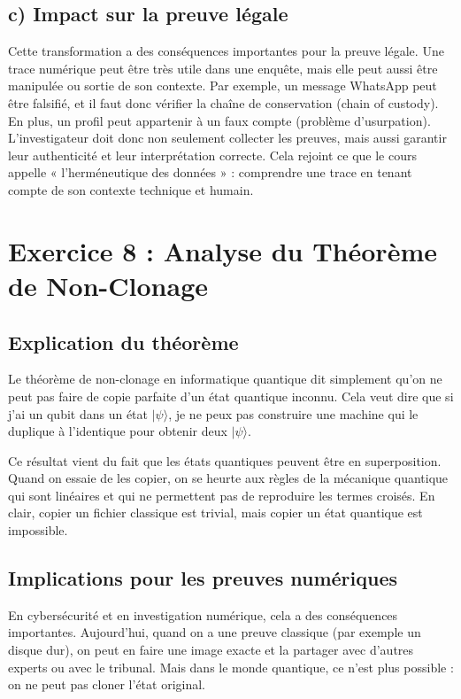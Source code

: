 \documentclass[12pt,a4paper]{report}
\begin{document}
	\subsection*{c) Impact sur la preuve légale}
	
	Cette transformation a des conséquences importantes pour la preuve légale.  
	Une trace numérique peut être très utile dans une enquête, 
	mais elle peut aussi être manipulée ou sortie de son contexte.  
	Par exemple, un message WhatsApp peut être falsifié, 
	et il faut donc vérifier la chaîne de conservation (chain of custody).  
	En plus, un profil peut appartenir à un faux compte (problème d’usurpation).  
	L’investigateur doit donc non seulement collecter les preuves, 
	mais aussi garantir leur authenticité et leur interprétation correcte.  
	Cela rejoint ce que le cours appelle « l’herméneutique des données » : 
	comprendre une trace en tenant compte de son contexte technique et humain.
	
	\section*{Exercice 8 : Analyse du Théorème de Non-Clonage}
	
	\subsection*{Explication du théorème}
	
	Le théorème de non-clonage en informatique quantique dit simplement qu’on ne peut pas 
	faire de copie parfaite d’un état quantique inconnu. Cela veut dire que si j’ai un qubit 
	dans un état \(|\psi\rangle\), je ne peux pas construire une machine qui le duplique à 
	l’identique pour obtenir deux \(|\psi\rangle\).  
	
	Ce résultat vient du fait que les états quantiques peuvent être en superposition. 
	Quand on essaie de les copier, on se heurte aux règles de la mécanique quantique qui 
	sont linéaires et qui ne permettent pas de reproduire les termes croisés. En clair, 
	copier un fichier classique est trivial, mais copier un état quantique est impossible.
	
	\subsection*{Implications pour les preuves numériques}
	
	En cybersécurité et en investigation numérique, cela a des conséquences importantes.  
	Aujourd’hui, quand on a une preuve classique (par exemple un disque dur), on peut 
	en faire une image exacte et la partager avec d’autres experts ou avec le tribunal.  
	Mais dans le monde quantique, ce n’est plus possible : on ne peut pas cloner l’état 
	original.  
	
\end{document}
